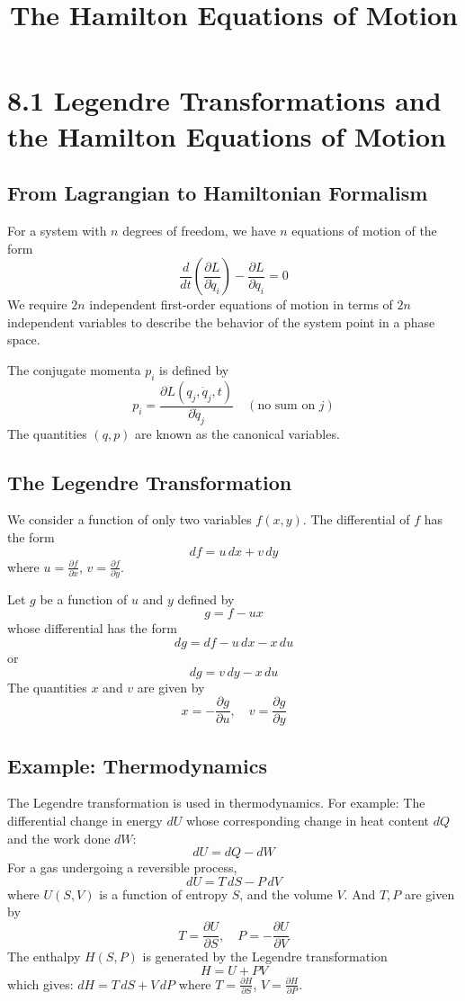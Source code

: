 \documentclass[12pt]{article}
\title{\textbf{The Hamilton Equations of Motion}}
\author{}
\date{}
\begin{document}
	\maketitle
	\vspace{-2cm}
	\section{8.1 Legendre Transformations and the Hamilton Equations of Motion}
	
	\subsection{From Lagrangian to Hamiltonian Formalism}
	For a system with $n$ degrees of freedom, we have $n$ equations of motion of the form
	$$
	\frac{d}{dt}\left(\frac{\partial L}{\partial \dot{q}_i}\right) - \frac{\partial L}{\partial q_i} = 0
	$$
	We require $2n$ independent first-order equations of motion in terms of $2n$ independent variables to describe the behavior of the system point in a phase space.
	
	The conjugate momenta $p_i$ is defined by
	$$
	p_i = \frac{\partial L(q_j, \dot{q}_j, t)}{\partial \dot{q}_j} \quad (\text{no sum on } j)
	$$
	The quantities $(q, p)$ are known as the canonical variables.
	
	\subsection{The Legendre Transformation}
	We consider a function of only two variables $f(x, y)$. The differential of $f$ has the form
	$$
	df = u\,dx + v\,dy
	$$
	where $u = \frac{\partial f}{\partial x}$, $v = \frac{\partial f}{\partial y}$.
	
	Let $g$ be a function of $u$ and $y$ defined by
	$$
	g = f - ux
	$$
	whose differential has the form
	$$
	dg = df - u\,dx - x\,du
	$$
	or
	$$
	dg = v\,dy - x\,du
	$$
	The quantities $x$ and $v$ are given by
	$$
	x = -\frac{\partial g}{\partial u}, \quad v = \frac{\partial g}{\partial y}
	$$
	
	\subsection{Example: Thermodynamics}
	The Legendre transformation is used in thermodynamics. For example: The differential change in energy $dU$ whose corresponding change in heat content $dQ$ and the work done $dW$:
	$$
	dU = dQ - dW
	$$
	For a gas undergoing a reversible process,
	$$
	dU = T\,dS - P\,dV
	$$
	where $U(S, V)$ is a function of entropy $S$, and the volume $V$. And $T, P$ are given by
	$$
	T = \frac{\partial U}{\partial S}, \quad P = -\frac{\partial U}{\partial V}
	$$
	The enthalpy $H(S, P)$ is generated by the Legendre transformation
	$$
	H = U + PV
	$$
	which gives: $dH = T\,dS + V\,dP$ where $T = \frac{\partial H}{\partial S}$, $V = \frac{\partial H}{\partial P}$.
	
\end{document}
